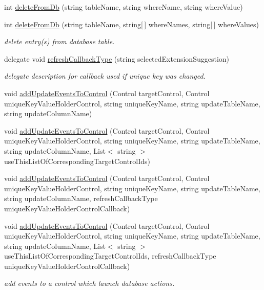 \begin{DoxyCompactItemize}
int \hyperlink{class_ias_pbx_config_1_1_db_helper_ad5986e97e1ec60f2e9ad2b83429d7d11}{deleteFromDb} (string tableName, string whereName, string whereValue)
\item 
int \hyperlink{class_ias_pbx_config_1_1_db_helper_a0b0e09192378e91c00084b10b52bff0a}{deleteFromDb} (string tableName, string\mbox{[}$\,$\mbox{]} whereNames, string\mbox{[}$\,$\mbox{]} whereValues)
\begin{DoxyCompactList}\small\item\em delete entry(s) from database table. \item\end{DoxyCompactList}\item 
delegate void \hyperlink{class_ias_pbx_config_1_1_db_helper_a9553dce2157909e881ef96ea9370ab41}{refreshCallbackType} (string selectedExtensionSuggestion)
\begin{DoxyCompactList}\small\item\em delegate description for callback used if unique key was changed. \item\end{DoxyCompactList}\item 
void \hyperlink{class_ias_pbx_config_1_1_db_helper_a08bf253f903973562550f24d9fb3308a}{addUpdateEventsToControl} (Control targetControl, Control uniqueKeyValueHolderControl, string uniqueKeyName, string updateTableName, string updateColumnName)
\item 
void \hyperlink{class_ias_pbx_config_1_1_db_helper_a24581849a3366fdb2b017501e7dc62ce}{addUpdateEventsToControl} (Control targetControl, Control uniqueKeyValueHolderControl, string uniqueKeyName, string updateTableName, string updateColumnName, List$<$ string $>$ useThisListOfCorrespondingTargetControlIds)
\item 
void \hyperlink{class_ias_pbx_config_1_1_db_helper_ac588d2d2d428389c00a882b2b36fac52}{addUpdateEventsToControl} (Control targetControl, Control uniqueKeyValueHolderControl, string uniqueKeyName, string updateTableName, string updateColumnName, refreshCallbackType uniqueKeyValueHolderControlCallback)
\item 
void \hyperlink{class_ias_pbx_config_1_1_db_helper_a25ba7bab44135f537dbee9d82952cb10}{addUpdateEventsToControl} (Control targetControl, Control uniqueKeyValueHolderControl, string uniqueKeyName, string updateTableName, string updateColumnName, List$<$ string $>$ useThisListOfCorrespondingTargetControlIds, refreshCallbackType uniqueKeyValueHolderControlCallback)
\begin{DoxyCompactList}\small\item\em add events to a control which launch database actions. \item\end{DoxyCompactList}\item 

\end{DoxyCompactItemize}

